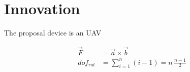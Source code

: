 
\section{Innovation} %
\label{sec:innovation}

The proposal device is an UAV \cite{ICAO}
\lipsum[2]

\begin{align}
  \vec F &= \vec a \times \vec b\\
  {dof}_{rot} &= \sum_{i=1}^n (i-1) = n\, \frac{n-1}{2}
\end{align}

\lipsum[7-13]
\lipsum[14-20]

